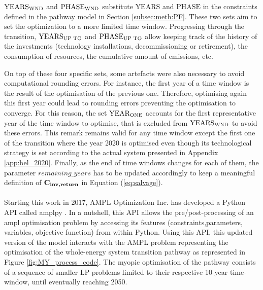$\text{YEARS}\textsubscript{WND}$ and $\text{PHASE}\textsubscript{WND}$ substitute $\text{YEARS}$ and $\text{PHASE}$ in the constraints defined in the pathway model in Section \ref{subsec:meth:PF}. These two sets aim to set the optimization to a more limited time window. Progressing through the transition, $\text{YEARS}\textsubscript{UP TO}$ and $\text{PHASE}\textsubscript{UP TO}$ allow keeping track of the history of the investments (\eg technology installations, decommissioning or retirement), the consumption of resources, the cumulative amount of emissions, etc.

On top of these four specific sets, some artefacts were also necessary to avoid computational rounding errors. For instance, the first year of a time window is the result of the optimisation of the previous one. Therefore, optimising again this first year could lead to rounding errors preventing the optimisation to converge. For this reason,  the set $\text{YEAR}\textsubscript{ONE}$ accounts for the first representative year of the time window to optimise, that is excluded from $\text{YEARS}\textsubscript{WND}$ to avoid these errors. This remark remains valid for any time window except the first one of the transition where the year 2020 is optimised even though its technological strategy is set according to the actual system presented in Appendix \ref{app:bel_2020}. Finally, as the end of time windows changes for each of them, the parameter $remaining\_years$ has to be updated accordingly to keep a meaningful definition of $\textbf{C\textsubscript{inv,return}}$ in Equation (\ref{eq:salvage}).\\

\\

\noindent
Starting this work in 2017, AMPL Optimization Inc. has developed a Python \gls{API} called amplpy \cite{amplpy}. In a nutshell, this API allows the pre/post-processing of an ampl optimisation problem by accessing its features (\eg constraints,parameters, variables, objective function) from within Python. Using this \gls{API}, this updated version of the model interacts with the AMPL problem representing the optimisation of the whole-energy system transition pathway as represented in Figure \ref{fig:MY_process_code}. The myopic optimisation of the pathway consists of a sequence of smaller \gls{LP} problems limited to their respective 10-year time-window, until eventually reaching 2050.\\


